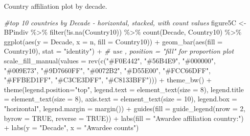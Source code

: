\documentclass[
]{article}
\newenvironment{Shaded}{\begin{snugshade}}{\end{snugshade}}
\newcommand{\AttributeTok}[1]{\textcolor[rgb]{0.77,0.63,0.00}{#1}}
\newcommand{\CommentTok}[1]{\textcolor[rgb]{0.56,0.35,0.01}{\textit{#1}}}
\newcommand{\ConstantTok}[1]{\textcolor[rgb]{0.00,0.00,0.00}{#1}}
\newcommand{\DecValTok}[1]{\textcolor[rgb]{0.00,0.00,0.81}{#1}}
\newcommand{\FunctionTok}[1]{\textcolor[rgb]{0.00,0.00,0.00}{#1}}
\newcommand{\NormalTok}[1]{#1}
\newcommand{\OtherTok}[1]{\textcolor[rgb]{0.56,0.35,0.01}{#1}}
\newcommand{\SpecialCharTok}[1]{\textcolor[rgb]{0.00,0.00,0.00}{#1}}
\newcommand{\StringTok}[1]{\textcolor[rgb]{0.31,0.60,0.02}{#1}}
\begin{document}
Country affiliation plot by decade.

\begin{Shaded}
\begin{Highlighting}[]
\CommentTok{\#top 10 countries by Decade {-} horizontal, stacked, with count values}
\NormalTok{figure5C }\OtherTok{\textless{}{-}}\NormalTok{ BPindiv }\SpecialCharTok{\%\textgreater{}\%} 
  \FunctionTok{filter}\NormalTok{(}\SpecialCharTok{!}\FunctionTok{is.na}\NormalTok{(Country10)) }\SpecialCharTok{\%\textgreater{}\%} 
  \FunctionTok{count}\NormalTok{(Decade, Country10) }\SpecialCharTok{\%\textgreater{}\%} 
  \FunctionTok{ggplot}\NormalTok{(}\FunctionTok{aes}\NormalTok{(}\AttributeTok{y =}\NormalTok{ Decade, }\AttributeTok{x =}\NormalTok{ n, }\AttributeTok{fill =}\NormalTok{ Country10)) }\SpecialCharTok{+}
  \FunctionTok{geom\_bar}\NormalTok{(}\FunctionTok{aes}\NormalTok{(}\AttributeTok{fill =}\NormalTok{ Country10), }\AttributeTok{stat =} \StringTok{"identity"}\NormalTok{) }\SpecialCharTok{+} \CommentTok{\# use , position = "fill" for proportion plot}
  \FunctionTok{scale\_fill\_manual}\NormalTok{(}\AttributeTok{values =} \FunctionTok{rev}\NormalTok{(}\FunctionTok{c}\NormalTok{(}\StringTok{"\#F0E442"}\NormalTok{, }\StringTok{"\#56B4E9"}\NormalTok{, }\StringTok{"\#000000"}\NormalTok{, }\StringTok{"\#009E73"}\NormalTok{, }\StringTok{"\#9D7660FF"}\NormalTok{, }\StringTok{"\#0072B2"}\NormalTok{, }\StringTok{"\#D55E00"}\NormalTok{, }\StringTok{"\#FCC66DFF"}\NormalTok{, }\StringTok{"\#FFBED1FF"}\NormalTok{, }\StringTok{"\#C3CE3DFF"}\NormalTok{, }\StringTok{"\#C8133BFF"}\NormalTok{))) }\SpecialCharTok{+}
  \FunctionTok{theme\_bw}\NormalTok{() }\SpecialCharTok{+}
  \FunctionTok{theme}\NormalTok{(}\AttributeTok{legend.position=}\StringTok{"top"}\NormalTok{, }\AttributeTok{legend.text =} \FunctionTok{element\_text}\NormalTok{(}\AttributeTok{size =} \DecValTok{8}\NormalTok{), }\AttributeTok{legend.title =} \FunctionTok{element\_text}\NormalTok{(}\AttributeTok{size =} \DecValTok{8}\NormalTok{),}
        \AttributeTok{axis.text =} \FunctionTok{element\_text}\NormalTok{(}\AttributeTok{size =} \DecValTok{10}\NormalTok{), }\AttributeTok{legend.box =} \StringTok{"horizontal"}\NormalTok{, }\AttributeTok{legend.margin =} \FunctionTok{margin}\NormalTok{()) }\SpecialCharTok{+}
  \FunctionTok{guides}\NormalTok{(}\AttributeTok{fill =} \FunctionTok{guide\_legend}\NormalTok{(}\AttributeTok{nrow =} \DecValTok{2}\NormalTok{, }\AttributeTok{byrow =} \ConstantTok{TRUE}\NormalTok{, }\AttributeTok{reverse =} \ConstantTok{TRUE}\NormalTok{)) }\SpecialCharTok{+} 
  \FunctionTok{labs}\NormalTok{(}\AttributeTok{fill =} \StringTok{"Awardee affiliation country:"}\NormalTok{) }\SpecialCharTok{+}
  \FunctionTok{labs}\NormalTok{(}\AttributeTok{y =} \StringTok{"Decade"}\NormalTok{, }\AttributeTok{x =} \StringTok{"Awardee counts"}\NormalTok{)  }


\end{Highlighting}
\end{Shaded}
\end{document}
